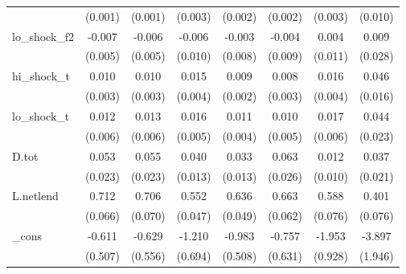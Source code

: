 {\begin{tabular}{l*{7}{c}}
            &     (0.001)         &     (0.001)         &     (0.003)         &     (0.002)         &     (0.002)         &     (0.003)         &     (0.010)         \\
\addlinespace
lo\_shock\_f2 &      -0.007         &      -0.006         &      -0.006         &      -0.003         &      -0.004         &       0.004         &       0.009         \\
            &     (0.005)         &     (0.005)         &     (0.010)         &     (0.008)         &     (0.009)         &     (0.011)         &     (0.028)         \\
\addlinespace
hi\_shock\_t  &       0.010\sym{***}&       0.010\sym{***}&       0.015\sym{***}&       0.009\sym{***}&       0.008\sym{**} &       0.016\sym{***}&       0.046\sym{***}\\
            &     (0.003)         &     (0.003)         &     (0.004)         &     (0.002)         &     (0.003)         &     (0.004)         &     (0.016)         \\
\addlinespace
lo\_shock\_t  &       0.012\sym{*}  &       0.013\sym{**} &       0.016\sym{***}&       0.011\sym{***}&       0.010\sym{*}  &       0.017\sym{***}&       0.044\sym{*}  \\
            &     (0.006)         &     (0.006)         &     (0.005)         &     (0.004)         &     (0.005)         &     (0.006)         &     (0.023)         \\
\addlinespace
D.tot       &       0.053\sym{**} &       0.055\sym{**} &       0.040\sym{***}&       0.033\sym{**} &       0.063\sym{**} &       0.012         &       0.037\sym{*}  \\
            &     (0.023)         &     (0.023)         &     (0.013)         &     (0.013)         &     (0.026)         &     (0.010)         &     (0.021)         \\
\addlinespace
L.netlend   &       0.712\sym{***}&       0.706\sym{***}&       0.552\sym{***}&       0.636\sym{***}&       0.663\sym{***}&       0.588\sym{***}&       0.401\sym{***}\\
            &     (0.066)         &     (0.070)         &     (0.047)         &     (0.049)         &     (0.062)         &     (0.076)         &     (0.076)         \\
\addlinespace
\_cons      &      -0.611         &      -0.629         &      -1.210\sym{*}  &      -0.983\sym{*}  &      -0.757         &      -1.953\sym{**} &      -3.897\sym{*}  \\
            &     (0.507)         &     (0.556)         &     (0.694)         &     (0.508)         &     (0.631)         &     (0.928)         &     (1.946)         \\

\end{tabular}}
